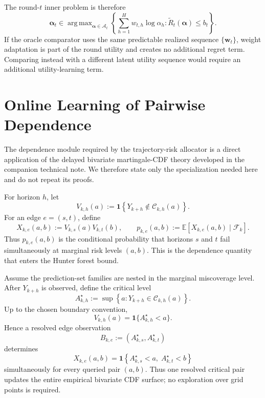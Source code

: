 \documentclass[11pt]{article}
\newcommand{\EE}{\mathbb{E}}
\newcommand{\calF}{\mathcal{F}}
\DeclareMathOperator*{\argmax}{arg\,max}
\begin{document}
The round-$t$ inner problem is therefore
\begin{equation}
\boxed{
    \bm\alpha_t
    \in
    \argmax_{\bm\alpha\in\mathcal A_t}
    \left\{
        \sum_{h=1}^H w_{t,h}\log\alpha_h:
        \widetilde R_t(\bm\alpha)\le b_t
    \right\}.
}
\label{eq:adaptive-weight-inner-problem}
\end{equation}
If the oracle comparator uses the same predictable realized sequence
$\{\bm w_t\}$, weight adaptation is part of the round utility and creates no
additional regret term.  Comparing instead with a different latent utility
sequence would require an additional utility-learning term.

\section{Online Learning of Pairwise Dependence}
\label{sec:dependence-learning}

The dependence module required by the trajectory-risk allocator is a direct
application of the delayed bivariate martingale-CDF theory developed in the
companion technical note.  We therefore state only the specialization needed
here and do not repeat its proofs.

For horizon $h$, let
\[
    V_{k,h}(a)
    :=
    \mathbf{1}
    \left\{
        Y_{k+h}\notin\mathcal C_{k,h}(a)
    \right\}.
\]
For an edge $e=(s,t)$, define
\[
    X_{k,e}(a,b)
    :=
    V_{k,s}(a)V_{k,t}(b),
    \qquad
    p_{k,e}(a,b)
    :=
    \EE\!\left[
        X_{k,e}(a,b)\mid\calF_k
    \right].
\]
Thus $p_{k,e}(a,b)$ is the conditional probability that horizons $s$ and
$t$ fail simultaneously at marginal risk levels $(a,b)$.  This is the
dependence quantity that enters the Hunter forest bound.

Assume the prediction-set families are nested in the marginal miscoverage
level.  After $Y_{k+h}$ is observed, define the critical level
\[
    A^\star_{k,h}
    :=
    \sup\left\{
        a:
        Y_{k+h}\in\mathcal C_{k,h}(a)
    \right\}.
\]
Up to the chosen boundary convention,
\[
    V_{k,h}(a)
    =
    \mathbf 1\{A^\star_{k,h}<a\}.
\]
Hence a resolved edge observation
\[
    B_{k,e}
    :=
    \left(
        A^\star_{k,s},
        A^\star_{k,t}
    \right)
\]
determines
\[
    X_{k,e}(a,b)
    =
    \mathbf 1
    \left\{
        A^\star_{k,s}<a,\;
        A^\star_{k,t}<b
    \right\}
\]
simultaneously for every queried pair $(a,b)$.  Thus one resolved critical
pair updates the entire empirical bivariate CDF surface; no exploration over
grid points is required.
\end{document}
